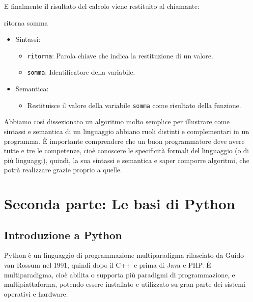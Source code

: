 \documentclass[
  letterpaper,
]{scrbook}
\newenvironment{Shaded}{\begin{snugshade}}{\end{snugshade}}
\newcommand{\NormalTok}[1]{\textcolor[rgb]{0.00,0.23,0.31}{#1}}
\providecommand{\tightlist}{%
  \setlength{\itemsep}{0pt}\setlength{\parskip}{0pt}}\usepackage{longtable,booktabs,array}
\begin{document}
E finalmente il risultato del calcolo viene restituito al chiamante:

\begin{Shaded}
\begin{Highlighting}[]
\NormalTok{ritorna somma}
\end{Highlighting}
\end{Shaded}

\begin{itemize}
\tightlist
\item
  Sintassi:

  \begin{itemize}
  \tightlist
  \item
    \texttt{ritorna}: Parola chiave che indica la restituzione di un
    valore.
  \item
    \texttt{somma}: Identificatore della variabile.
  \end{itemize}
\item
  Semantica:

  \begin{itemize}
  \tightlist
  \item
    Restituisce il valore della variabile \texttt{somma} come risultato
    della funzione.
  \end{itemize}
\end{itemize}

Abbiamo così dissezionato un algoritmo molto semplice per illustrare
come sintassi e semantica di un linguaggio abbiano ruoli distinti e
complementari in un programma. È importante comprendere che un buon
programmatore deve avere tutte e tre le competenze, cioè conoscere le
specificità formali del linguaggio (o di più linguaggi), quindi, la sua
sintassi e semantica e saper comporre algoritmi, che potrà realizzare
grazie proprio a quelle.

\part{Seconda parte: Le basi di Python}

\chapter{Introduzione a Python}\label{introduzione-a-python}

Python è un linguaggio di programmazione multiparadigma rilasciato da
Guido van Rossum nel 1991, quindi dopo il C++ e prima di Java e PHP. È
multiparadigma, cioè abilita o supporta più paradigmi di programmazione,
e multipiattaforma, potendo essere installato e utilizzato su gran parte
dei sistemi operativi e hardware.
\end{document}
